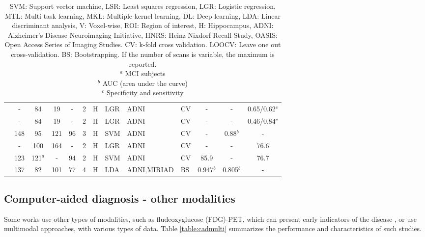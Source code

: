 \begin{table}[]
{\begin{tabular}{@{}lcccccllllccc@{}}
 \cite{Fiot2012} & - & 84 & 19 & - & 2 & H & LGR & ADNI & CV & - & - & 0.65/0.62$^{c}$ \\
 \cite{Fiot2014} & - & 84 & 19 & - & 2 & H & LGR & ADNI & CV & - & - & 0.46/0.84$^{c}$ \\
 \cite{chincarini} & 148 & 95 & 121 & 96 & 3 & H & SVM & ADNI & CV & - & 0.88$^{b}$  & - \\ 
 \cite{Sanroma2017}  & - & 100 & 164 & - & 2 & H & LGR & ADNI & CV & - & - & 76.6 \\
 \cite{Shi2017} & 123 & 121$^{a}$ & - & 94 & 2 & H & SVM & ADNI & CV & 85.9 & - & 76.7 \\
 \cite{Platero2019} & 137 & 82 & 101 & 77 & 4 & H & LDA & ADNI,MIRIAD & BS & 0.947$^{b}$ & 0.805$^{b}$ & - \\
 \bottomrule
\end{tabular}}
\caption*{\footnotesize SVM: Support vector machine, LSR: Least squares regression, LGR: Logistic regression, MTL: Multi task learning, MKL: Multiple kernel learning, DL: Deep learning, LDA: Linear discriminant analysis, V: Voxel-wise, ROI: Region of interest, H: Hippocampus, ADNI: Alzheimer’s Disease Neuroimaging Initiative, HNRS: Heinz Nixdorf Recall Study, OASIS: Open Access Series of Imaging Studies. CV: k-fold cross validation. LOOCV: Leave one out cross-validation. BS: Bootstrapping. If the number of scans is variable, the maximum is reported. \\
         $^{a}$ MCI subjects \\
         $^{b}$ AUC (area under the curve) \\
         $^{c}$ Specificity and sensitivity \\
         }
\end{table}
\normalsize

\subsection{Computer-aided diagnosis - other modalities}

Some works use other types of modalities, such as fludeoxyglucose (FDG)-PET, which can present early indicators of the disease \cite{Jack2013}, or use multimodal approaches, with various types of data. Table \ref{table:cadmulti} summarizes the performance and characteristics of such studies. \\

